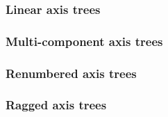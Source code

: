\documentclass[thesis]{subfiles}
\begin{document}
\subsubsection{Linear axis trees}



\subsubsection{Multi-component axis trees}

\subsubsection{Renumbered axis trees}

\subsubsection{Ragged axis trees}
\end{document}
